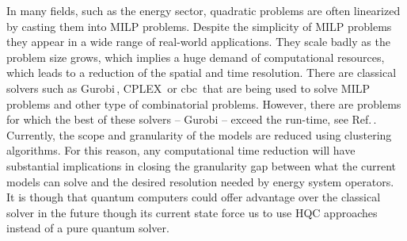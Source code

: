 In many fields, such as the energy sector, quadratic problems are often linearized by casting them into MILP problems. Despite the simplicity of MILP problems they appear in a wide range of real-world applications. They scale badly as the problem size grows, which implies a huge demand of computational resources, which leads to a reduction of the spatial and time resolution. There are classical solvers such as Gurobi\,\cite{gurobi}, CPLEX\,\cite{cplex2009v12} or cbc\,\cite{cbc} that are being used to solve MILP problems and other type of combinatorial problems. However, there are problems for which the best of these solvers -- Gurobi -- exceed the run-time, see Ref.\,\cite{Fernandez-Campoamor2021CommunityAnnealing}. Currently, the scope and granularity of the models
are reduced using clustering algorithms. For this reason, any computational time reduction will have substantial implications in closing the granularity gap between what the current models can solve and the desired resolution needed by energy system operators. It is though that quantum computers could offer advantage over the classical solver in the future though its current state force us to use HQC approaches instead of a pure quantum solver.

